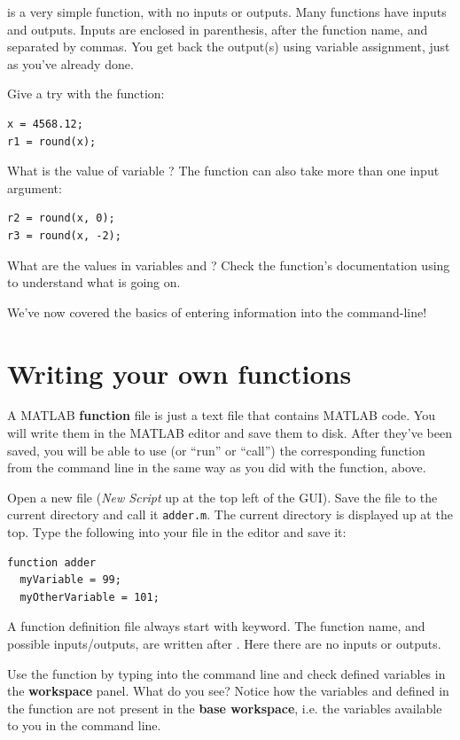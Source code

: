 \documentclass{article}
\begin{document}
 is a very simple function, with no inputs or outputs.
Many functions have inputs and outputs.
Inputs are enclosed in parenthesis, after the function name, and separated by commas.
You get back the output(s) using variable assignment, just as you've already done.

Give a try with the  function:
\begin{lstlisting}
x = 4568.12;
r1 = round(x);
\end{lstlisting}
What is the value of variable ? The  function can also take more than one input argument:
\begin{lstlisting}
r2 = round(x, 0);
r3 = round(x, -2);
\end{lstlisting}
What are the values in variables  and ?
Check the function's documentation using  to understand what is going on.

We've now covered the basics of entering information into the command-line!


\pagebreak
\section{Writing your own functions}

A MATLAB \textbf{function} file is just a text file that contains MATLAB code.
You will write them in the MATLAB editor and save them to disk.
After they've been saved, you will be able to use (or ``run'' or ``call'') the corresponding function from the command line in the same way as you did with the  function, above.

Open a new file (\emph{New Script} up at the top left of the GUI).
Save the file to the current directory and call it \texttt{adder.m}.
The current directory is displayed up at the top.
Type the following into your file in the editor and save it:
\begin{lstlisting}
function adder
  myVariable = 99;
  myOtherVariable = 101;
\end{lstlisting}
A function definition file always start with  keyword.
The function name, and possible inputs/outputs, are written after .
Here there are no inputs or outputs.

Use the function by typing  into the command line and check defined variables in the \textbf{workspace} panel. What do you see?
Notice how the variables  and  defined in the  function are not present in the \textbf{base workspace}, i.e. the variables available to you in the command line.
\end{document}
